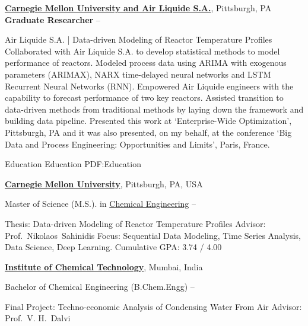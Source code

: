 \documentclass[letterpaper,MMMyyyy,nonstopmode]{simpleresumecv}
\begin{document}
\begin{Body}
\Entry
\href{http://cmu.edu/cheme}
{\textbf{Carnegie Mellon University and Air Liquide S.A.}},
Pittsburgh, PA
\Entry
\textbf{Graduate Researcher}
\hfill
{} --

\Gap
\BulletItem
Air Liquide S.A. | Data-driven Modeling of Reactor Temperature Profiles
\SubBulletItem
Collaborated with Air Liquide S.A. to develop statistical methods to model performance of reactors.
\SubBulletItem
Modeled process data using ARIMA with exogenous parameters (ARIMAX), NARX time-delayed neural networks and LSTM Recurrent Neural Networks (RNN).
\SubBulletItem
Empowered Air Liquide engineers with the capability to forecast performance of two key reactors.
\SubBulletItem
Assisted transition to data-driven methods from traditional methods by laying down the framework and building data pipeline.
\SubBulletItem
Presented this work at ‘Enterprise-Wide Optimization’, Pittsburgh, PA and it was also presented, on my behalf, at the conference ‘Big Data and Process Engineering: Opportunities and Limits’, Paris, France.


\Section
{Education}
{Education}
{PDF:Education}

\Entry
\href{http://www.cmu.edu/}
{\textbf{Carnegie Mellon University}},
Pittsburgh, PA, USA

\Gap
\BulletItem
Master of Science (M.S.). in
\href{http://www.cmu.edu/cheme}
{Chemical Engineering}
\hfill
{} --
\begin{Detail}
\SubBulletItem
Thesis:
{Data-driven Modeling of Reactor Temperature Profiles}
\SubBulletItem
Advisor:
Prof.~Nikolaos~Sahinidis
\SubBulletItem
Focus:
Sequential Data Modeling, Time Series Analysis, Data Science, Deep Learning.
\SubBulletItem
Cumulative GPA: 3.74 / 4.00
\end{Detail}

\BigGap
\Entry
\href{http://www.ictmumbai.edu.in/}
{\textbf{Institute of Chemical Technology}},
Mumbai, India

\Gap
\BulletItem
Bachelor of Chemical Engineering (B.Chem.Engg)
\hfill
{} --
\begin{Detail}
\SubBulletItem
Final Project:
{Techno-economic Analysis of Condensing Water From Air}
\SubBulletItem
Advisor:
Prof.~V. H.~Dalvi
\end{Detail}


\end{Body}
\end{document}
